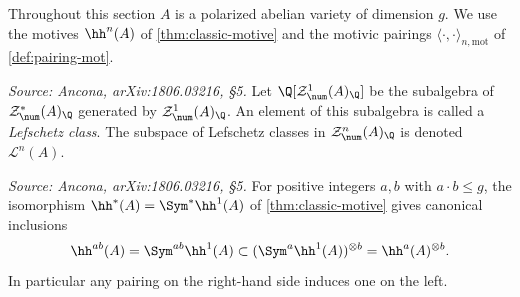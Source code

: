 Throughout this section \(A\) is a polarized abelian variety of dimension \(g\).
We use the motives \(\hh^n(A)\) of \cref{thm:classic-motive} and the motivic
pairings \(\langle \cdot, \cdot \rangle_{n,\mathrm{mot}}\) of
\cref{def:pairing-mot}.

\begin{definition}
  \label{def:lefschetz-class}
  \textit{Source: Ancona, arXiv:1806.03216, §5.}
  Let \(\Q[\mathcal{Z}^{1}_{\num}(A)_{\Q}]\) be the subalgebra of
  \(\mathcal{Z}^{*}_{\num}(A)_{\Q}\) generated by
  \(\mathcal{Z}^{1}_{\num}(A)_{\Q}\). An element of this subalgebra is called a
  \emph{Lefschetz class}. The subspace of Lefschetz classes in
  \(\mathcal{Z}^{n}_{\num}(A)_{\Q}\) is denoted \(\mathcal{L}^{n}(A)\).
\end{definition}

\begin{remark}
  \label{rem:sym-inclusion}
  \textit{Source: Ancona, arXiv:1806.03216, §5.}
  For positive integers \(a, b\) with \(a \cdot b \le g\), the isomorphism
  \(\hh^*(A) = \Sym^* \hh^1(A)\) of \cref{thm:classic-motive} gives canonical
  inclusions
  \[\hh^{a b}(A) = \Sym^{a b} \hh^1(A) \subset
    (\Sym^{a} \hh^1(A))^{\otimes b} = \hh^a(A)^{\otimes b}.\]
  In particular any pairing on the right-hand side induces one on the left.
\end{remark}

